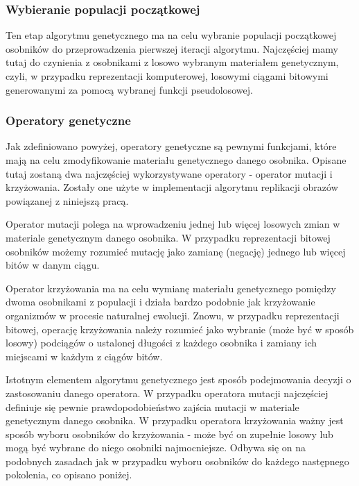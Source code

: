 \subsubsection{Wybieranie populacji początkowej}
Ten etap algorytmu genetycznego ma na celu wybranie populacji początkowej osobników do przeprowadzenia pierwszej iteracji algorytmu. Najczęściej mamy tutaj do czynienia z osobnikami z losowo wybranym materiałem genetycznym, czyli, w przypadku reprezentacji komputerowej, losowymi ciągami bitowymi generowanymi za pomocą wybranej funkcji pseudolosowej.

\subsubsection{Operatory genetyczne}
Jak zdefiniowano powyżej, operatory genetyczne są pewnymi funkcjami, które mają na celu zmodyfikowanie materiału genetycznego danego osobnika. Opisane tutaj zostaną dwa najczęściej wykorzystywane operatory - operator mutacji i krzyżowania. Zostały one użyte w implementacji algorytmu replikacji obrazów powiązanej z niniejszą pracą.

Operator mutacji polega na wprowadzeniu jednej lub więcej losowych zmian w materiale genetycznym danego osobnika. W przypadku reprezentacji bitowej osobników możemy rozumieć mutację jako zamianę (negację) jednego lub więcej bitów w danym ciągu.

Operator krzyżowania ma na celu wymianę materiału genetycznego pomiędzy dwoma osobnikami z populacji i działa bardzo podobnie jak krzyżowanie organizmów w procesie naturalnej ewolucji. Znowu, w przypadku reprezentacji bitowej, operację krzyżowania należy rozumieć jako wybranie (może być w sposób losowy) podciągów o ustalonej długości z każdego osobnika i zamiany ich miejscami w każdym z ciągów bitów.

Istotnym elementem algorytmu genetycznego jest sposób podejmowania decyzji o zastosowaniu danego operatora. W przypadku operatora mutacji najczęściej definiuje się pewnie prawdopodobieństwo zajścia mutacji w materiale genetycznym danego osobnika. W przypadku operatora krzyżowania ważny jest sposób wyboru osobników do krzyżowania - może być on zupełnie losowy lub mogą być wybrane do niego osobniki najmocniejsze. Odbywa się on na podobnych zasadach jak w przypadku wyboru osobników do każdego następnego pokolenia, co opisano poniżej.

